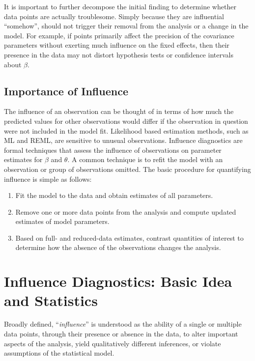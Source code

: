 \documentclass[12pt, a4paper]{report}
\theoremstyle{plain}
\theoremstyle{definition}
\theoremstyle{remark}
\begin{document}
		It is important to further decompose the initial finding to determine whether data points are actually troublesome.
		Simply because they are influential “somehow”, should not trigger their removal from the analysis or
		a change in the model. For example, if points primarily affect the precision of the covariance parameters
		without exerting much influence on the fixed effects, then their presence in the data may not distort hypothesis
		tests or confidence intervals about $\beta$.
		
		\subsection{Importance of Influence}
		The influence of an observation can be thought of in terms of how much the predicted values for other observations would differ if the observation in question were not included in the model fit.
		Likelihood based estimation methods, such as ML and REML, are sensitive to unusual observations. Influence diagnostics are formal techniques that assess the influence of observations on parameter estimates for $\beta$ and $\theta$. A common technique is to refit the model with an observation or group of observations omitted. The basic procedure for quantifying influence is simple as follows:
		
		
		\begin{enumerate}
			\item Fit the model to the data and obtain estimates of all parameters.
			\item Remove one or more data points from the analysis and compute updated estimates of model parameters.
			\item Based on full- and reduced-data estimates, contrast quantities of interest to determine how the absence of the observations changes the analysis.
		\end{enumerate}	
		
		
		
		\section{Influence Diagnostics: Basic Idea and Statistics} %
		Broadly defined, ``\textit{influence}” is understood as the ability of a single or multiple data points, through their presence or absence in the data, to alter important aspects of the analysis, yield qualitatively different inferences, or
		violate assumptions of the statistical model. 
		
\end{document}
